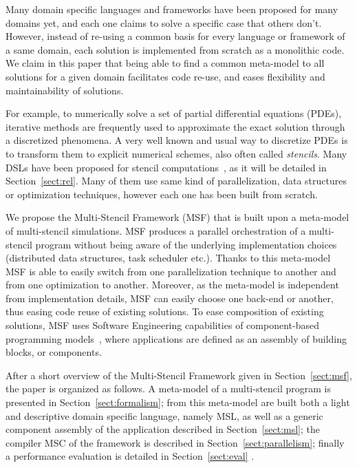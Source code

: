 Many domain specific languages and frameworks have been proposed for many domains yet, and each one claims to solve a specific case that others don't. However, instead of re-using a common basis for every language or framework of a same domain, each solution is implemented from scratch as a monolithic code. We claim in this paper that being able to find a common meta-model to all solutions for a given domain facilitates code re-use, and eases flexibility and maintainability of solutions.

For example, to numerically solve a set of partial differential equations (PDEs), iterative methods are frequently used to approximate the exact solution through a discretized phenomena. A very well known and usual way to discretize PDEs is to transform them to explicit numerical schemes, also often called \emph{stencils}. Many DSLs have been proposed for stencil computations~\cite{spaaTangCKLL11,citeulike12258902,Ragan-Kelley:2013:HLC:2491956.2462176,DeVito:2011:LDS:2063384.2063396,Camier:2015:IPP:2820083.2820107}, as it will be detailed in Section~\ref{sect:rel}. Many of them use same kind of parallelization, data structures or optimization techniques, however each one has been built from scratch. 

We propose the Multi-Stencil Framework (MSF) that is built upon a meta-model of multi-stencil simulations. MSF produces a parallel orchestration of a multi-stencil program without being aware of the underlying implementation choices (\eg distributed data structures, task scheduler etc.). Thanks to this meta-model MSF is able to easily switch from one parallelization technique to another and from one optimization to another. Moreover, as the meta-model is independent from implementation details, MSF can easily choose one back-end or another, thus easing code reuse of existing solutions. To ease composition of existing solutions, MSF uses Software Engineering capabilities of component-based programming models~\cite{Szyperski:2002:CSB:515228}, where applications are defined as an assembly of building blocks, or components.

After a short overview of the Multi-Stencil Framework given in Section~\ref{sect:msf}, the paper is organized as follows. A meta-model of a multi-stencil program is presented in Section~\ref{sect:formalism}; from this meta-model are built both a light and descriptive domain specific language, namely MSL, as well as a generic component assembly of the application described in Section~\ref{sect:msl}; the compiler MSC of the framework is described in Section~\ref{sect:parallelism}; finally a performance evaluation is detailed in Section~\ref{sect:eval} .

